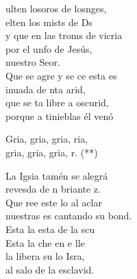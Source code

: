 \begin{cancion}%
	ulten losoros de losnges, \\
	elten los mists de Ds \\
	y que en las troms de vicria\\
	por el unfo de Jesús, \\
	nuestro Seor.\\
	\jump
	Que se agre y se ce esta es\\
	inuada de nta arid, \\
	que se ta libre a oscurid,\\
	porque a  tinieblas él venó\jump\\
	\begin{chorus}%
		Gria, gria, gria, ria,\\
		gria, gria, gria, r. (**)\jump\\
	\end{chorus}%
	La Igsia tamén se alegrá\\
	revesda de n briante z.\\
	Que ree este lo al aclar\\
	nuestras es cantando su bond.\\
	\jump
	Esta  la esta de la scu\\
	Esta  la che en e lle  \\
	la libera su lo Isra,\\
	al salo de la esclavid. \jump\\

\end{cancion}
